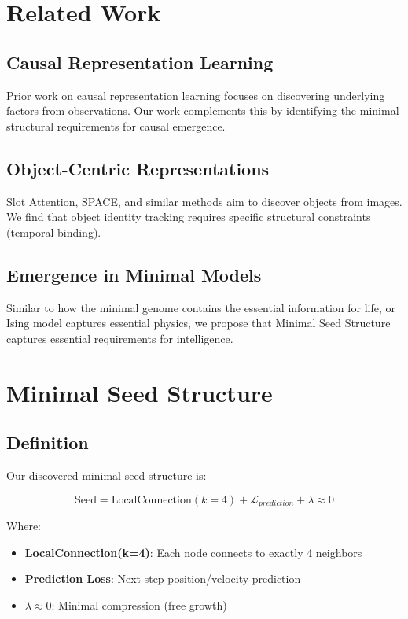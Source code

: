 \documentclass{article}
\begin{document}
\section{Related Work}

\subsection{Causal Representation Learning}
Prior work on causal representation learning focuses on discovering underlying factors from observations. Our work complements this by identifying the minimal structural requirements for causal emergence.

\subsection{Object-Centric Representations}
Slot Attention, SPACE, and similar methods aim to discover objects from images. We find that object identity tracking requires specific structural constraints (temporal binding).

\subsection{Emergence in Minimal Models}
Similar to how the minimal genome contains the essential information for life, or Ising model captures essential physics, we propose that Minimal Seed Structure captures essential requirements for intelligence.

\section{Minimal Seed Structure}

\subsection{Definition}
Our discovered minimal seed structure is:

\begin{equation}
\text{Seed} = \text{LocalConnection}(k=4) + \mathcal{L}_{prediction} + \lambda \approx 0
\end{equation}

Where:
\begin{itemize}
\item \textbf{LocalConnection(k=4)}: Each node connects to exactly 4 neighbors
\item \textbf{Prediction Loss}: Next-step position/velocity prediction
\item \textbf{$\lambda \approx 0$}: Minimal compression (free growth)
\end{itemize}
\end{document}

